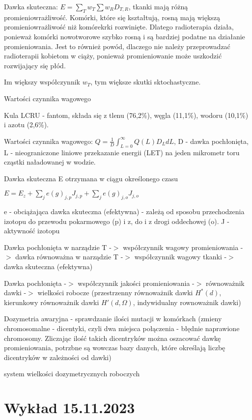 \documentclass{article}
\begin{document}
Dawka skuteczna: $E = \sum_T w_T \sum w_R D_{T,R}$, tkanki mają różną promieniowrażliwość. Komórki, które się kształtują, rosną mają większą promieniowrażliwość niż komórekrki rozwinięte. Dlatego radioterapia działa, ponieważ komórki nowotworowe szybko rosną i są bardziej podatne na działanie promieniowania. Jest to również powód, dlaczego nie należy przeprowadzać radioterapii kobietom w ciąży, ponieważ promieniowanie może uszkodzić rozwijający się płód.

Im większy współczynnik $w_T$, tym większe skutki sktochastyczne.

Wartości czynnika wagowego

Kula LCRU - fantom, składa się z tlenu (76,2\%), węgla (11,1\%), wodoru (10,1\%) i azotu (2,6\%).

Wartości czynnika wagowego: $Q = \frac{1}{D}\int_{L=0}^{\infty} Q(L)D_LdL$, D - dawka pochłonięta, L - nieograniczone liniowe przekazanie energii (LET) na jeden mikrometr toru cząstki naładowanej w wodzie.

Dawka skuteczna E otrzymana w ciągu określonego czasu

$E = E_z + \sum_j e(g)_{j,p}J_{j,p} + \sum_j e(g)_{j,o}J_{j,o}$

e - obciążająca dawka skuteczna (efektywna) - zależą od sposobu przechodzenia izotopu do przewodu pokarmowego (p) i z, do i z drogi oddechowej (o).
J - aktywność izotopu

Dawka pochłonięta w narządzie T -$>$ współczynnik wagowy promieniowania -$>$ dawka równoważna w narządzie T -$>$ współczynnik wagowy tkanki -$>$ dawka skuteczna (efektywna)

Dawka pochłonięta -$>$ współczynnik jakości promieniowania -$>$ równoważnik dawki -$>$ wielkości robocze (przestrzenny równoważnik dawki $H^*(d)$, kierunkowy równoważnik dawki $H'(d,\Omega)$, indywidualny rownoważnik dawki)

Dozymetria awaryjna - sprawdzanie ilości mutacji w komórkach (zmieny chromosomalne - dicentyki, czyli dwa miejsca połączenia - błędnie naprawione chromosomy. Zliczając ilość takich dicentryków można oszacować dawkę promieniowania, potrzbne są wowczas bazy danych, które określają liczbę dicentryków w zależności od dawki)

system wielkości dozymetrycznych roboczych

\section{Wykład 15.11.2023}
\end{document}
